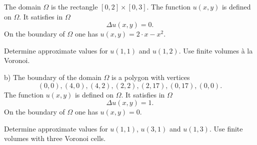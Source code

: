 \begin{teilaufgaben}
\item
The domain $\Omega$ is the rectangle $[0,2] \times [0, 3]$. 
The function $u(x,y)$ is defined on $\Omega$.
It satisfies in $\Omega$ 
\[
\Delta u(x,y) = 0.
\]
On the boundary of $\Omega$ one has $u(x,y) = 2 \cdot x - x^2$. 

Determine approximate values for $u(1,1)$ and $u(1,2)$. 
Use finite volumes \`a la Voronoi.  

\item
b) The boundary of the domain $\Omega$ is a polygon with vertices
\[
(0,0), (4,0), 
(4, 2), (2,2), (2,17), (0,17), (0,0).
\]
The function $u(x,y)$ is defined on $\Omega$. It satisfies in $\Omega$ 
\[
\Delta u(x,y) = 1.
\]
On the boundary of $\Omega$ one has $u(x,y) = 0$.

Determine approximate values for $u(1,1)$, $u(3,1)$ and $u(1,3)$.
Use finite volumes with three Voronoi cells.   
\end{teilaufgaben}


